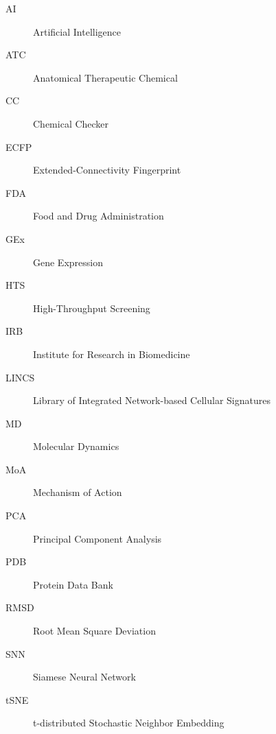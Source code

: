 

\begin{description}
    \item[AI] Artificial Intelligence
    \item[ATC] Anatomical Therapeutic Chemical
    \item[CC] Chemical Checker
    \item[ECFP] Extended-Connectivity Fingerprint
    \item[FDA] Food and Drug Administration
    \item[GEx] Gene Expression
    \item[HTS] High-Throughput Screening
    \item[IRB] Institute for Research in Biomedicine 
    \item[LINCS] Library of Integrated Network-based Cellular Signatures
    \item[MD] Molecular Dynamics
    \item[MoA] Mechanism of Action
    \item[PCA] Principal Component Analysis
    \item[PDB] Protein Data Bank
    \item[RMSD] Root Mean Square Deviation 
    \item[SNN] Siamese Neural Network
    \item[tSNE] t-distributed Stochastic Neighbor Embedding
\end{description}

